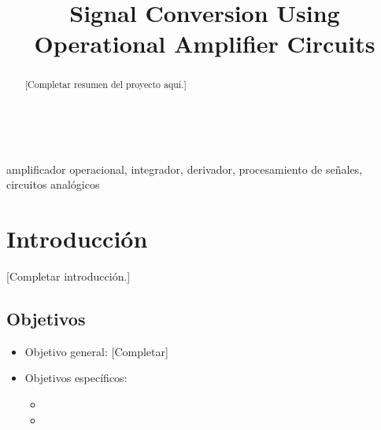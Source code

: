\documentclass[conference]{IEEEtran}
\begin{document}
\title{Signal Conversion Using Operational Amplifier Circuits}\\

\author{%
    \and
}

\maketitle

\begin{abstract}
[Completar resumen del proyecto aquí.]
\end{abstract}

\begin{IEEEkeywords}
amplificador operacional, integrador, derivador, procesamiento de señales, circuitos analógicos
\end{IEEEkeywords}

\section{Introducción}
[Completar introducción.]

\subsection{Objetivos}
\begin{itemize}
    \item Objetivo general: [Completar]
    \item Objetivos específicos:
    \begin{itemize}
        \item [Completar]
        \item [Completar]
    \end{itemize}
\end{itemize}
\end{document}
